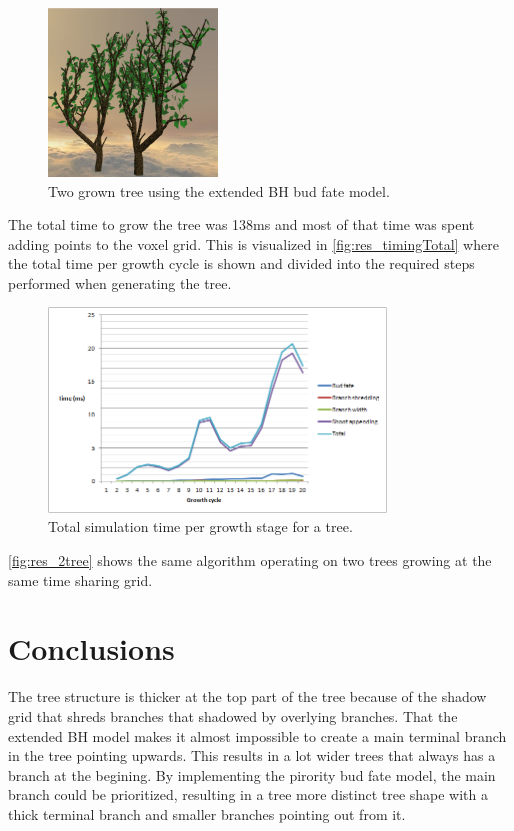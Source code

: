 \documentclass[11pt]{article} %
\begin{document}
\begin{figure}[!htp]
	\centering
	\includegraphics[width=0.4\textwidth]{2tree.png}
	\caption{Two grown tree using the extended BH bud fate model.}
	\label{fig:res_2tree}
\end{figure}

The total time to grow the tree was 138ms and most of that time was spent adding points to the voxel grid.
This is visualized in \autoref{fig:res_timingTotal} where the total time per growth cycle is shown and divided into the required steps performed when generating the tree.

\begin{figure}[htp]
	\centering
	\includegraphics[width=0.8\textwidth]{timingTotal.png}
	\caption{Total simulation time per growth stage for a tree.}
	\label{fig:res_timingTotal}
\end{figure}

\autoref{fig:res_2tree} shows the same algorithm operating on two trees growing at the same time sharing grid.

\section{Conclusions}
The tree structure is thicker at the top part of the tree because of the shadow grid that shreds branches that shadowed by overlying branches.
That the extended BH model makes it almost impossible to create a main terminal branch in the tree pointing upwards.
This results in a lot wider trees that always has a branch at the begining.
By implementing the pirority bud fate model, the main branch could be prioritized, resulting in a tree more distinct tree shape with a thick terminal branch and smaller branches pointing out from it.
\end{document}
